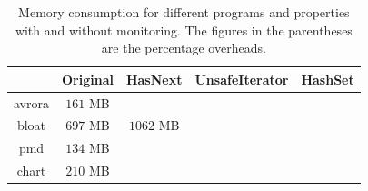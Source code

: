 \begin{table}[t]
\centering
\small
\begin{tabular}{|c|c|c|c|c|}
\hline
 & Original & HasNext & UnsafeIterator & HashSet\\
 \hline
avrora  & $161$ MB & & &\\\hline
bloat & $697$ MB & $1062$ MB &  &\\\hline
pmd  & $134$ MB &  & &\\\hline
chart & $210$ MB & & &\\\hline
\end{tabular}
\caption{Memory consumption for different programs and properties with and 
without monitoring. The figures in the parentheses are the percentage 
overheads. %
}
\end{table}
\label{table:consumedmemory}

